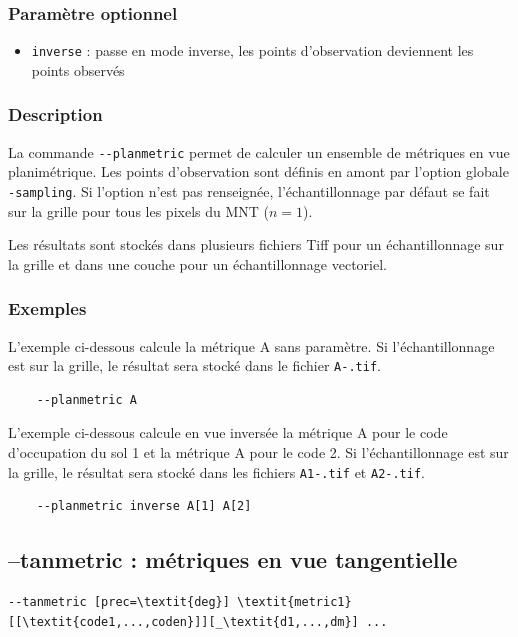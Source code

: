 \documentclass{report}
\begin{document}
\subsubsection{Paramètre optionnel}
\begin{itemize}
	\item \verb|inverse| : passe en mode inverse, les points d'observation deviennent les points observés
\end{itemize}

\subsubsection{Description}
La commande \verb|--planmetric| permet de calculer un ensemble de métriques en vue planimétrique. Les points d'observation sont définis en amont par l'option globale \verb|-sampling|. Si l'option n'est pas renseignée, l'échantillonnage par défaut se fait sur la grille pour tous les pixels du MNT ($n=1$).

Les résultats sont stockés dans plusieurs fichiers Tiff pour un échantillonnage sur la grille et dans une couche pour un échantillonnage vectoriel.


\subsubsection{Exemples}

L'exemple ci-dessous calcule la métrique A sans paramètre. Si l'échantillonnage est sur la grille, le résultat sera stocké dans le fichier \verb|A-.tif|.
\begin{Verbatim}
	--planmetric A
\end{Verbatim}

L'exemple ci-dessous calcule en vue inversée la métrique A pour le code d'occupation du sol 1 et la métrique A pour le code 2. Si l'échantillonnage est sur la grille, le résultat sera stocké dans les fichiers \verb|A1-.tif| et \verb|A2-.tif|.
\begin{Verbatim}
	--planmetric inverse A[1] A[2]
\end{Verbatim}


\subsection{--tanmetric : métriques en vue tangentielle}
\begin{Verbatim}[commandchars=\\\{\}]
--tanmetric [prec=\textit{deg}] \textit{metric1}[[\textit{code1,...,coden}]][_\textit{d1,...,dm}] ...
\end{Verbatim}
\end{document}
